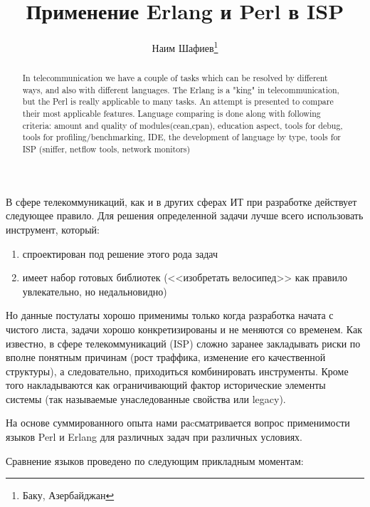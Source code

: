 \documentclass[10pt, a5paper]{article}
\begin{document}
\title{Применение Erlang и Perl в ISP}%

\author{Наим Шафиев\footnote{Баку, Азербайджан}}
\maketitle

\begin{abstract}
In telecommunication we have a couple of tasks which can be resolved by different ways, and also with different languages. The Erlang is a "king" in telecommunication, but the Perl is really applicable to many tasks. An attempt is presented to compare their most applicable features. Language comparing is done along with following criteria: amount and quality of modules(cean,cpan), education aspect, tools for debug, tools for profiling/benchmarking, IDE, the development of language by type, tools for ISP (sniffer, netflow tools, network monitors)
\end{abstract}


В сфере телекоммуникаций, как и в других сферах ИТ при разработке действует следующее правило. Для решения определенной задачи лучше всего использовать инструмент, который:

\begin{enumerate}
  \item спроектирован под решение этого рода задач
  \item имеет набор готовых библиотек (<<изобретать велосипед>> как правило увлекательно, но  недальновидно)
\end{enumerate}

Но данные постулаты хорошо применимы только когда разработка начата с чистого листа, задачи хорошо конкретизированы и не меняются со временем.
Как известно, в сфере телекоммуникаций (ISP) сложно заранее закладывать риски по вполне понятным причинам (рост траффика, изменение его качественной структуры), а следовательно, приходиться комбинировать инструменты. Кроме того накладываются как ограничивающий фактор исторические элементы системы (так называемые унаследованные свойства или legacy).

На основе суммированного опыта нами раcсматривается вопрос применимости языков Perl и Erlang для различных задач при различных условиях.

Сравнение языков проведено по следующим прикладным моментам:
\end{document}
